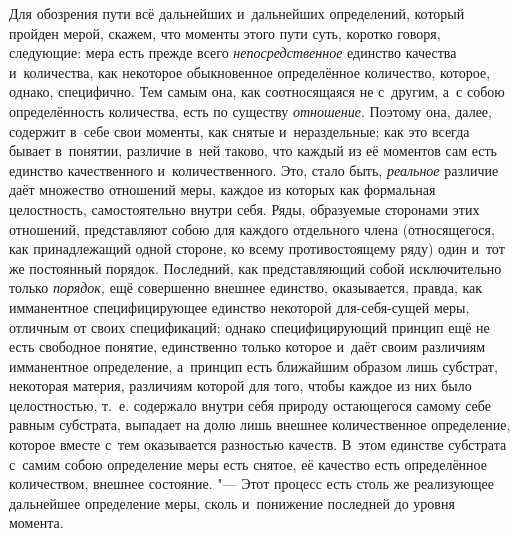 Для обозрения пути всё дальнейших и~дальнейших определений, который пройден
мерой, скажем, что моменты этого пути суть, коротко говоря, следующие: мера
есть прежде всего {\em непосредственное} единство качества и~количества, как
некоторое обыкновенное определённое количество, которое, однако, специфично.
Тем самым она, как соотносящаяся не с~другим, а~с собою определённость
количества, есть по существу {\em отношение}. Поэтому она, далее, содержит
в~себе свои моменты, как снятые и~нераздельные; как это всегда бывает
в~понятии, различие в~ней таково, что каждый из её моментов сам есть единство
качественного и~количественного. Это, стало быть, {\em реальное} различие даёт
множество отношений меры, каждое из которых как формальная целостность,
самостоятельно внутри себя. Ряды, образуемые сторонами этих отношений,
представляют собою для каждого отдельного члена (относящегося, как
принадлежащий одной стороне, ко всему противостоящему ряду) один и~тот же
постоянный порядок. Последний, как представляющий собой исключительно только
{\em порядок,} ещё совершенно внешнее единство, оказывается, правда, как
имманентное специфицирующее единство некоторой для-себя-сущей меры, отличным
от своих спецификаций; однако специфицирующий принцип ещё не есть свободное
понятие, единственно только которое и~даёт своим различиям имманентное
определение, а~принцип есть ближайшим образом лишь субстрат, некоторая материя,
различиям которой для того, чтобы каждое из них было целостностью, т.~е.
содержало внутри себя природу остающегося самому себе равным субстрата,
выпадает на долю лишь внешнее количественное определение, которое вместе
с~тем оказывается разностью качеств. В~этом единстве субстрата с~самим собою
определение меры есть снятое, её качество есть определённое количеством,
внешнее состояние. "--- Этот процесс есть столь же реализующее дальнейшее
определение меры, сколь и~понижение последней до уровня момента.
